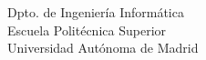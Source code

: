 \chapter*{}

\vspace*{0.2cm}

\begin{center}

\Huge \MakeUppercase{\textbf{\titulo}}

\vspace{7cm}

\Large \autor \\
\Large \tutor \\
\Large \ponente \\

\vspace{6cm}


Dpto. de Ingeniería Informática \\
Escuela Politécnica Superior \\
Universidad Autónoma de Madrid \\
\fecha

\end{center}

\normalsize

\newpage \thispagestyle{empty} %
